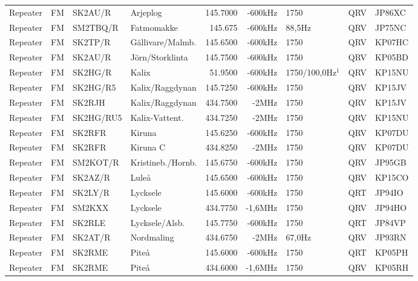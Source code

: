 \begin{landscape}
\begin{longtable}{llllrrlcl}
Repeater & FM     & SK2AU/R   & Arjeplog           & 145.7000 & -600kHz & 1750             & QRV  & JP86XC \\
Repeater & FM     & SM2TBQ/R  & Fatmomakke         & 145.675  & -600kHz & 88,5Hz           & QRV  & JP75NC \\
Repeater & FM     & SK2TP/R   & Gällivare/Malmb.   & 145.6500 & -600kHz & 1750             & QRV  & KP07HC \\
Repeater & FM     & SK2AU/R   & Jörn/Storklinta    & 145.7500 & -600kHz & 1750             & QRV  & KP05BD \\
Repeater & FM     & SK2HG/R   & Kalix              & 51.9500  & -600kHz & 1750/100,0Hz$^1$ & QRV  & KP15NU \\
Repeater & FM     & SK2HG/R5  & Kalix/Raggdynan    & 145.7250 & -600kHz & 1750             & QRV  & KP15JV \\
Repeater & FM     & SK2RJH    & Kalix/Raggdynan    & 434.7500 & -2MHz   & 1750             & QRV  & KP15JV \\
Repeater & FM     & SK2HG/RU5 & Kalix-Vattent.     & 434.7250 & -2MHz   & 1750             & QRV  & KP15NU \\
Repeater & FM     & SK2RFR    & Kiruna             & 145.6250 & -600kHz & 1750             & QRV  & KP07DU \\
Repeater & FM     & SK2RFR    & Kiruna C           & 434.8250 & -2MHz   & 1750             & QRV  & KP07DU \\
Repeater & FM     & SM2KOT/R  & Kristineb./Hornb.  & 145.6750 & -600kHz & 1750             & QRV  & JP95GB \\
Repeater & FM     & SK2AZ/R   & Luleå              & 145.6500 & -600kHz & 1750             & QRV  & KP15CO \\
Repeater & FM     & SK2LY/R   & Lycksele           & 145.6000 & -600kHz & 1750             & QRT  & JP94IO \\
Repeater & FM     & SM2KXX    & Lycksele           & 434.7750 & -1,6MHz & 1750             & QRV  & JP94HO \\
Repeater & FM     & SK2RLE    & Lycksele/Alsb.     & 145.7750 & -600kHz & 1750             & QRT  & JP84VP \\
Repeater & FM     & SK2AT/R   & Nordmaling         & 434.6750 & -2MHz   & 67,0Hz           & QRV  & JP93RN \\
Repeater & FM     & SK2RME    & Piteå              & 145.6000 & -600kHz & 1750             & QRT  & KP05PH \\
Repeater & FM     & SK2RME    & Piteå              & 434.6000 & -1,6MHz & 1750             & QRV  & KP05RH \\

\end{longtable}
\end{landscape}
